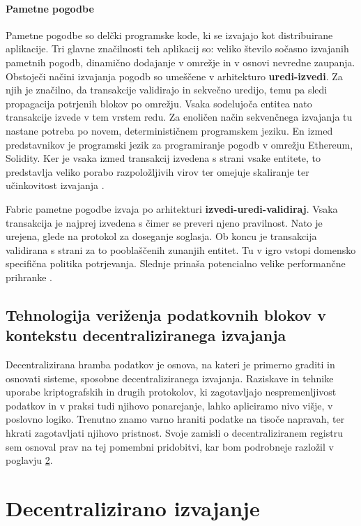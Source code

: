 \documentclass[a4paper, 12pt]{book}
\begin{document}
\subsubsection{Pametne pogodbe}
Pametne pogodbe so delčki programske kode, ki se izvajajo kot distribuirane aplikacije.
Tri glavne značilnosti teh aplikacij so: veliko število sočasno izvajanih pametnih pogodb, dinamično dodajanje v omrežje in v osnovi nevredne zaupanja.
Obstoječi načini izvajanja pogodb so umeščene v arhitekturo \textbf{uredi-izvedi}.
Za njih je značilno, da transakcije validirajo in sekvečno uredijo, temu pa sledi propagacija potrjenih blokov po omrežju.
Vsaka sodelujoča entitea nato transakcije izvede v tem vrstem redu.
Za enoličen način sekvenčnega izvajanja tu nastane potreba po novem, determinističnem programskem jeziku.
En izmed predstavnikov je programski jezik za programiranje pogodb v omrežju Ethereum, Solidity.
Ker je vsaka izmed transakcij izvedena s strani vsake entitete, to predstavlja veliko porabo razpoložljivih virov ter omejuje skaliranje ter učinkovitost izvajanja \cite{hyperledgerDocs}.

Fabric pametne pogodbe izvaja po arhitekturi \textbf{izvedi-uredi-validiraj}.
Vsaka transakcija je najprej izvedena s čimer se preveri njeno pravilnost.
Nato je urejena, glede na protokol za doseganje soglasja.
Ob koncu je transakcija validirana s strani za to pooblaščenih zunanjih entitet.
Tu v igro vstopi domensko specifična politika potrjevanja.
Slednje prinaša potencialno velike performančne prihranke \cite{hyperledgerDocs}.

\section{Tehnologija veriženja podatkovnih blokov v kontekstu decentraliziranega izvajanja}
Decentralizirana hramba podatkov je osnova, na kateri je primerno graditi in osnovati sisteme, sposobne decentraliziranega izvajanja.
Raziskave in tehnike uporabe kriptografskih in drugih protokolov, ki zagotavljajo nespremenljivost podatkov in v praksi tudi njihovo ponarejanje, lahko apliciramo nivo višje, v poslovno logiko.
Trenutno znamo varno hraniti podatke na tisoče napravah, ter hkrati zagotavljati njihovo pristnost.
Svoje zamisli o decentraliziranem registru sem osnoval prav na tej pomembni pridobitvi, kar bom podrobneje razložil v poglavju \ref{ch4}.

\chapter{Decentralizirano izvajanje}
\label{ch4}
\end{document}
